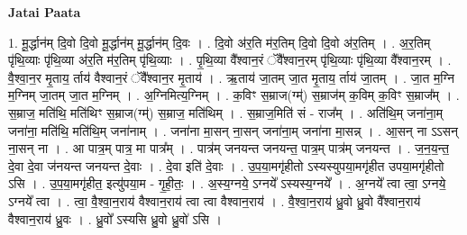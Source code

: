 \documentclass[17pt]{extarticle}
\begin{document}
\textbf{Jatai Paata} \newline

1. मू॒र्द्धान॑म् दि॒वो दि॒वो मू॒र्द्धान॑म् मू॒र्द्धान॑म् दि॒वः । . दि॒वो अ॑र॒ति म॑र॒तिम् दि॒वो दि॒वो अ॑र॒तिम् । . अ॒र॒तिम् पृ॑थि॒व्याः पृ॑थि॒व्या अ॑र॒ति म॑र॒तिम् पृ॑थि॒व्याः । . पृ॒थि॒व्या वै᳚श्वान॒रं ॅवै᳚श्वान॒रम् पृ॑थि॒व्याः पृ॑थि॒व्या वै᳚श्वान॒रम् । . वै॒श्वा॒न॒र मृ॒ताय॒ र्ताय॑ वैश्वान॒रं ॅवै᳚श्वान॒र मृ॒ताय॑ । . ऋ॒ताय॑ जा॒तम् जा॒त मृ॒ताय॒ र्ताय॑ जा॒तम् । . जा॒त म॒ग्नि म॒ग्निम् जा॒तम् जा॒त म॒ग्निम् । . अ॒ग्निमित्य॒ग्निम् । . क॒विꣳ स॒म्राज(ग्म्॑) स॒म्राज॑म् क॒विम् क॒विꣳ स॒म्राज᳚म् । . स॒म्राज॒ मति॑थि॒ मति॑थिꣳ स॒म्राज(ग्म्॑) स॒म्राज॒ मति॑थिम् । . स॒म्राज॒मिति॑ सं - राज᳚म् । . अति॑थि॒म् जना॑ना॒म् जना॑ना॒ मति॑थि॒ मति॑थि॒म् जना॑नाम् । . जना॑ना मा॒सन् ना॒सन् जना॑ना॒म् जना॑ना मा॒सन्न् । . आ॒सन् ना ऽऽसन् ना॒सन् ना । . आ पात्र॒म् पात्र॒ मा पात्र᳚म् । . पात्र॑म् जनयन्त जनयन्त॒ पात्र॒म् पात्र॑म् जनयन्त । . ज॒न॒य॒न्त॒ दे॒वा दे॒वा ज॑नयन्त जनयन्त दे॒वाः । . दे॒वा इति॑ दे॒वाः । . उ॒प॒या॒मगृ॑हीतो ऽस्यस्युपया॒मगृ॑हीत उपया॒मगृ॑हीतो ऽसि । . उ॒प॒या॒मगृ॑हीत॒ इत्यु॑पया॒म - गृ॒ही॒तः॒ । . अ॒स्य॒ग्नये॒ ऽग्नये᳚ ऽस्यस्य॒ग्नये᳚ । . अ॒ग्नये᳚ त्वा त्वा॒ ऽग्नये॒ ऽग्नये᳚ त्वा । . त्वा॒ वै॒श्वा॒न॒राय॑ वैश्वान॒राय॑ त्वा त्वा वैश्वान॒राय॑ । . वै॒श्वा॒न॒राय॑ ध्रु॒वो ध्रु॒वो वै᳚श्वान॒राय॑ वैश्वान॒राय॑ ध्रु॒वः । . ध्रु॒वो᳚ ऽस्यसि ध्रु॒वो ध्रु॒वो॑ ऽसि । \newline
\end{document}
